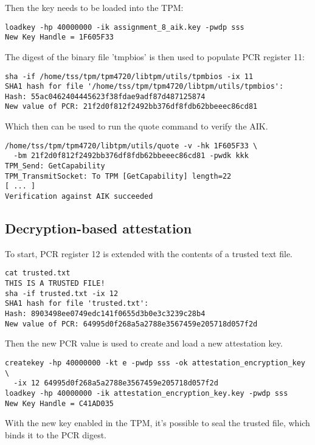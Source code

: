 \documentclass[10pt]{article}
\begin{document}
    Then the key needs to be loaded into the TPM:

\begin{verbatim}
loadkey -hp 40000000 -ik assignment_8_aik.key -pwdp sss
New Key Handle = 1F605F33
\end{verbatim}

    The digest of the binary file 'tmpbios' is then used to populate PCR
    register 11:

\begin{verbatim}
sha -if /home/tss/tpm/tpm4720/libtpm/utils/tpmbios -ix 11
SHA1 hash for file '/home/tss/tpm/tpm4720/libtpm/utils/tpmbios':
Hash: 55ac0462404445623f38fdae9adf87d487125874
New value of PCR: 21f2d0f812f2492bb376df8fdb62bbeeec86cd81
\end{verbatim}

    Which then can be used to run the quote command to verify the AIK.

\begin{verbatim}
/home/tss/tpm/tpm4720/libtpm/utils/quote -v -hk 1F605F33 \
  -bm 21f2d0f812f2492bb376df8fdb62bbeeec86cd81 -pwdk kkk
TPM_Send: GetCapability
TPM_TransmitSocket: To TPM [GetCapability] length=22
[ ... ]
Verification against AIK succeeded
\end{verbatim}

  \subsection{Decryption-based attestation}

    To start, PCR register 12 is extended with the contents of a trusted text
    file.

\begin{verbatim}
cat trusted.txt
THIS IS A TRUSTED FILE!
sha -if trusted.txt -ix 12
SHA1 hash for file 'trusted.txt':
Hash: 8903498ee0749edc141f0655d3b0e3c3239c28b4
New value of PCR: 64995d0f268a5a2788e3567459e205718d057f2d
\end{verbatim}

    Then the new PCR value is used to create and load  a new attestation key.

\begin{verbatim}
createkey -hp 40000000 -kt e -pwdp sss -ok attestation_encryption_key \
  -ix 12 64995d0f268a5a2788e3567459e205718d057f2d
loadkey -hp 40000000 -ik attestation_encryption_key.key -pwdp sss
New Key Handle = C41AD035
\end{verbatim}

    With the new key enabled in the TPM, it's possible to seal the trusted
    file, which binds it to the PCR digest.
\end{document}

